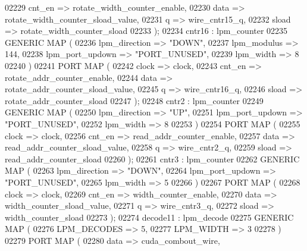 \begin{DoxyCode}
{02229         cnt\_en => rotate_width_counter_enable,
02230         data => rotate_width_counter_sload_value,
02231         q => wire_cntr15_q,
02232         sload => rotate_width_counter_sload
02233       \textcolor{vhdlchar}{)};
02234     cntr16 :  lpm\_counter
02235       \textcolor{keywordflow}{GENERIC} \textcolor{keywordflow}{MAP} (
02236         lpm\_direction => \textcolor{keyword}{"DOWN"},
02237         lpm\_modulus => \textcolor{vhdllogic}{144},
02238         lpm\_port\_updown => \textcolor{keyword}{"PORT\_UNUSED"},
02239         lpm\_width => \textcolor{vhdllogic}{8}
02240       \textcolor{vhdlchar}{)}
02241       \textcolor{keywordflow}{PORT} \textcolor{keywordflow}{MAP} ( 
02242         clock => clock,
02243         cnt\_en => rotate_addr_counter_enable,
02244         data => rotate_addr_counter_sload_value,
02245         q => wire_cntr16_q,
02246         sload => rotate_addr_counter_sload
02247       \textcolor{vhdlchar}{)};
02248     cntr2 :  lpm\_counter
02249       \textcolor{keywordflow}{GENERIC} \textcolor{keywordflow}{MAP} (
02250         lpm\_direction => \textcolor{keyword}{"UP"},
02251         lpm\_port\_updown => \textcolor{keyword}{"PORT\_UNUSED"},
02252         lpm\_width => \textcolor{vhdllogic}{8}
02253       \textcolor{vhdlchar}{)}
02254       \textcolor{keywordflow}{PORT} \textcolor{keywordflow}{MAP} ( 
02255         clock => clock,
02256         cnt\_en => read_addr_counter_enable,
02257         data => read_addr_counter_sload_value,
02258         q => wire_cntr2_q,
02259         sload => read_addr_counter_sload
02260       \textcolor{vhdlchar}{)};
02261     cntr3 :  lpm\_counter
02262       \textcolor{keywordflow}{GENERIC} \textcolor{keywordflow}{MAP} (
02263         lpm\_direction => \textcolor{keyword}{"DOWN"},
02264         lpm\_port\_updown => \textcolor{keyword}{"PORT\_UNUSED"},
02265         lpm\_width => \textcolor{vhdllogic}{5}
02266       \textcolor{vhdlchar}{)}
02267       \textcolor{keywordflow}{PORT} \textcolor{keywordflow}{MAP} ( 
02268         clock => clock,
02269         cnt\_en => width_counter_enable,
02270         data => width_counter_sload_value,
02271         q => wire_cntr3_q,
02272         sload => width_counter_sload
02273       \textcolor{vhdlchar}{)};
02274     decode11 :  lpm\_decode
02275       \textcolor{keywordflow}{GENERIC} \textcolor{keywordflow}{MAP} (
02276         LPM\_DECODES => \textcolor{vhdllogic}{5},
02277         LPM\_WIDTH => \textcolor{vhdllogic}{3}
02278       \textcolor{vhdlchar}{)}
02279       \textcolor{keywordflow}{PORT} \textcolor{keywordflow}{MAP} ( 
02280         data => cuda_combout_wire,
}
\end{DoxyCode}
